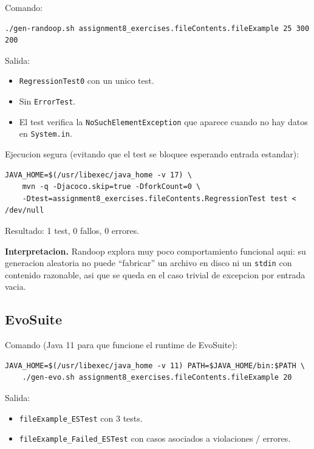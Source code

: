 \documentclass[12pt,a4paper]{article}
\begin{document}
Comando:

\begin{lstlisting}[style=codestyle]
./gen-randoop.sh assignment8_exercises.fileContents.fileExample 25 300 200
\end{lstlisting}

Salida:

\begin{itemize}
  \item \texttt{RegressionTest0} con un unico test.
  \item Sin \texttt{ErrorTest}.
  \item El test verifica la \texttt{NoSuchElementException} que aparece cuando no hay datos
  en \texttt{System.in}.
\end{itemize}

Ejecucion segura (evitando que el test se bloquee esperando entrada estandar):

\begin{lstlisting}[style=codestyle]
JAVA_HOME=$(/usr/libexec/java_home -v 17) \
    mvn -q -Djacoco.skip=true -DforkCount=0 \
    -Dtest=assignment8_exercises.fileContents.RegressionTest test < /dev/null
\end{lstlisting}

Resultado: 1 test, 0 fallos, 0 errores.

\textbf{Interpretacion.} Randoop explora muy poco comportamiento funcional aqui: su
generacion aleatoria no puede ``fabricar'' un archivo en disco ni un \texttt{stdin} con
contenido razonable, asi que se queda en el caso trivial de excepcion por entrada vacia.

\subsection{EvoSuite}

Comando (Java 11 para que funcione el runtime de EvoSuite):

\begin{lstlisting}[style=codestyle]
JAVA_HOME=$(/usr/libexec/java_home -v 11) PATH=$JAVA_HOME/bin:$PATH \
    ./gen-evo.sh assignment8_exercises.fileContents.fileExample 20
\end{lstlisting}

Salida:

\begin{itemize}
  \item \texttt{fileExample\_ESTest} con 3 tests.
  \item \texttt{fileExample\_Failed\_ESTest} con casos asociados a violaciones / errores.
\end{itemize}
\end{document}
